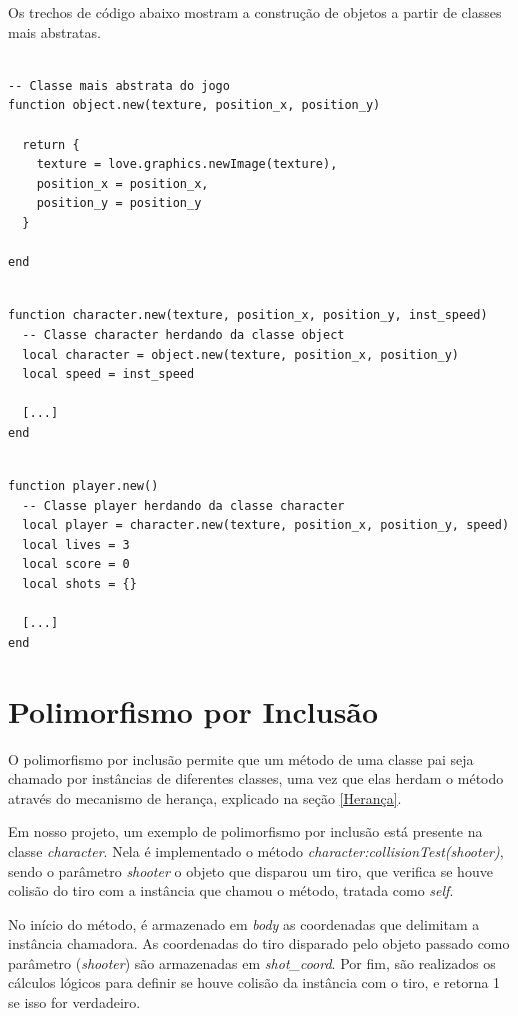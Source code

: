 \documentclass[rel_mlp]{iiufrgs}
\begin{document}
Os trechos de código abaixo mostram a construção de objetos a partir de classes mais abstratas.

\begin{lstlisting}

-- Classe mais abstrata do jogo
function object.new(texture, position_x, position_y)

  return {
    texture = love.graphics.newImage(texture),
    position_x = position_x,
    position_y = position_y
  }

end

\end{lstlisting}

\begin{lstlisting}

function character.new(texture, position_x, position_y, inst_speed)
  -- Classe character herdando da classe object
  local character = object.new(texture, position_x, position_y)
  local speed = inst_speed
  
  [...]
end

\end{lstlisting}

\begin{lstlisting}

function player.new()
  -- Classe player herdando da classe character
  local player = character.new(texture, position_x, position_y, speed)
  local lives = 3
  local score = 0
  local shots = {}
  
  [...]
end

\end{lstlisting}


\section{Polimorfismo por Inclusão}

O polimorfismo por inclusão permite que um método de uma classe pai seja chamado por instâncias de diferentes classes, uma vez que elas herdam o método através do mecanismo de herança, explicado na seção \ref{Herança}. 

Em nosso projeto, um exemplo de polimorfismo por inclusão está presente na classe \textit{character}. Nela é implementado o método \textit{character:collisionTest(shooter)}, sendo o parâmetro \textit{shooter} o objeto que disparou um tiro, que verifica se houve colisão do tiro com a instância que chamou o método, tratada como \textit{self}.

No início do método, é armazenado em \textit{body} as coordenadas que delimitam a instância chamadora. As coordenadas do tiro disparado pelo objeto passado como parâmetro (\textit{shooter}) são armazenadas em \textit{shot\_coord}. Por fim, são realizados os cálculos lógicos para definir se houve colisão da instância com o tiro, e retorna 1 se isso for verdadeiro.
\end{document}
